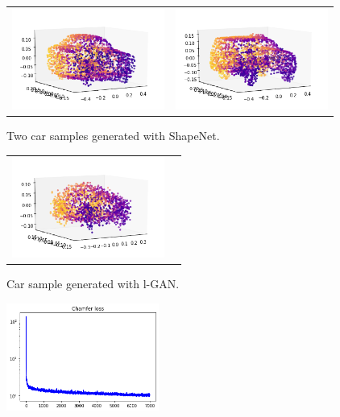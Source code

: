 \documentclass[12pt]{article}
\begin{document}
    \begin{figure}
        \centering
        \begin{tabular}{cc}
            \includegraphics[width = 50mm]{car-shapenet-1} &
            \includegraphics[width = 50mm]{car-shapenet-2} \\
        \end{tabular}
        \caption{Two car samples generated with ShapeNet.}
    \end{figure}


    \begin{figure}
        \centering
        \begin{tabular}{cc}
            \includegraphics[width = 50mm]{car-lgan}
        \end{tabular}
        \caption{Car sample generated with l-GAN.}
    \end{figure}


    \begin{figure}
        \centering
        \includegraphics[width = 50mm]{chamfer-loss}
    \end{figure}
\end{document}
